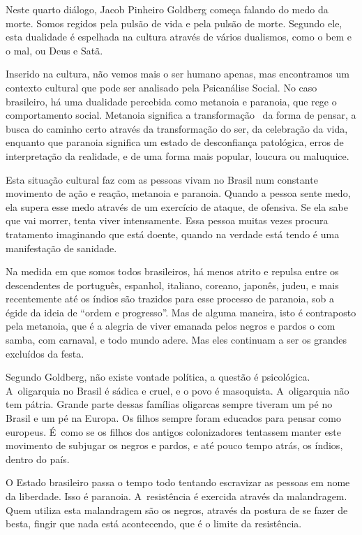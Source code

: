  

Neste quarto diálogo, Jacob Pinheiro Goldberg começa falando do medo da
morte. Somos regidos pela pulsão de vida e pela pulsão de morte. Segundo
ele, esta dualidade é espelhada na cultura através de vários dualismos,
como o bem e o mal, ou Deus e Satã.

Inserido na cultura, não vemos mais o ser humano apenas, mas encontramos
um contexto cultural que pode ser analisado pela Psicanálise Social. No
caso brasileiro, há uma dualidade percebida como metanoia e paranoia,
que rege o comportamento social. Metanoia significa a transformação~ da
forma de pensar, a busca do caminho certo através da transformação do
ser, da celebração da vida, enquanto que paranoia significa um estado de
desconfiança patológica, erros de interpretação da realidade, e de uma
forma mais popular, loucura ou maluquice.

Esta situação cultural faz com as pessoas vivam no Brasil num constante
movimento de ação e reação, metanoia e paranoia. Quando a pessoa sente
medo, ela supera esse medo através de um exercício de ataque, de
ofensiva. Se ela sabe que vai morrer, tenta viver intensamente. Essa
pessoa muitas vezes procura tratamento imaginando que está doente,
quando na verdade está tendo é uma manifestação de sanidade.

Na medida em que somos todos brasileiros, há menos atrito e repulsa
entre os descendentes de português, espanhol, italiano, coreano,
japonês, judeu, e mais recentemente até os índios são trazidos para esse
processo de paranoia, sob a égide da ideia de ``ordem e progresso''. Mas
de alguma maneira, isto é contraposto pela metanoia, que é a alegria de
viver emanada pelos negros e pardos o com samba, com carnaval, e todo
mundo adere. Mas eles continuam a ser os grandes excluídos da festa.

Segundo Goldberg, não existe vontade política, a questão é psicológica.
A~oligarquia no Brasil é sádica e cruel, e o povo é masoquista. A~oligarquia não tem pátria. Grande parte dessas famílias oligarcas sempre
tiveram um pé no Brasil e um pé na Europa. Os filhos sempre foram
educados para pensar como europeus. É~como se os filhos dos antigos
colonizadores tentassem manter este movimento de subjugar os negros e
pardos, e até pouco tempo atrás, os índios, dentro do país.

O Estado brasileiro passa o tempo todo tentando escravizar as pessoas em
nome da liberdade. Isso é paranoia. A~resistência é exercida através da
malandragem. Quem utiliza esta malandragem são os negros, através da
postura de se fazer de besta, fingir que nada está acontecendo, que é o
limite da resistência.

